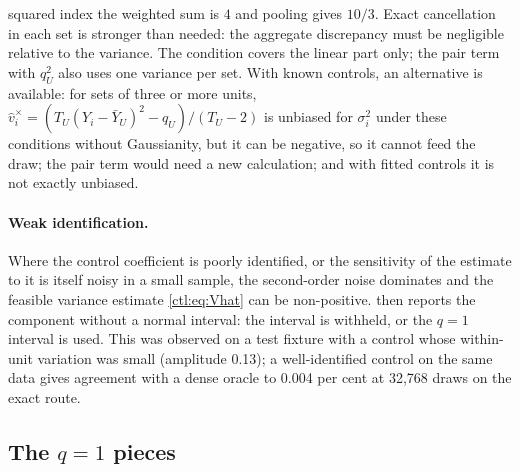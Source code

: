 \begin{enumerate}
squared index the weighted sum is $4$ and pooling gives $10/3$. Exact cancellation in each set is stronger than
needed: the aggregate discrepancy must be negligible relative to the variance. The condition covers the linear
part only; the pair term with $q_U^2$ also uses one variance per set. With known controls, an alternative is available: for sets of three or more
units, $\hat v_i^\times=(T_U(Y_i-\bar Y_U)^2-q_U)/(T_U-2)$ is unbiased for $\sigma_i^2$ under these conditions without
Gaussianity, but it can be negative, so it cannot feed the draw; the pair term would need a new calculation; and
with fitted controls it is not exactly unbiased.
\end{enumerate}

\paragraph{Weak identification.} Where the control coefficient is poorly identified, or the sensitivity of the
estimate to it is itself noisy in a small sample, the second-order noise dominates and the feasible variance
estimate \eqref{ctl:eq:Vhat} can be non-positive. \fevc{} then reports the component without a normal interval: the
interval is withheld, or the $q=1$ interval is used. This was observed on a test fixture with a control whose
within-unit variation was small (amplitude 0.13); a well-identified control on the same data gives agreement with
a dense oracle to 0.004 per cent at 32{,}768 draws on the exact route.

\subsection{The $q=1$ pieces}\label{ctl:q1}

